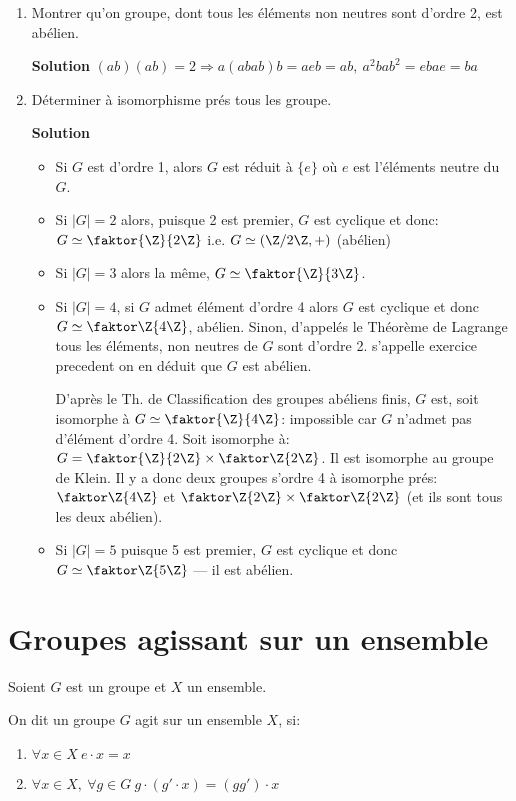 \begin{examplebox}
	\begin{enumerate}
		\item Montrer qu'on groupe, dont tous les éléments non neutres sont d'ordre 2, est abélien.
		
		\textbf{Solution} $(ab)(ab)=2 \Rightarrow a(abab)b=aeb=ab,\ a^2bab^2=ebae=ba$
		\item Déterminer à isomorphisme prés tous les groupe.
		
		\textbf{Solution} 
		\begin{itemize}
			\item Si $G$ est d'ordre 1, alors $G$ est réduit à $\{e\}$ où $e$ est l'éléments neutre du $G$.
			\item Si $|G|=2$ alors, puisque 2 est premier, $G$ est cyclique et donc: $G\simeq \faktor{\Z}{2\Z}$ i.e. $G\simeq (\Z/2\Z, +)$ (abélien)
			\item Si $|G|=3$ alors la même, $G\simeq \faktor{\Z}{3\Z}$.
			\item Si $|G|=4$, si $G$ admet élément d'ordre 4 alors $G$ est cyclique et donc $G\simeq \faktor\Z{4\Z}$, abélien. Sinon, d'appelés le Théorème de Lagrange tous les éléments, non neutres de $G$ sont d'ordre 2. s'appelle exercice precedent on en déduit que $G$ est abélien.
			
			D'après le Th. de Classification des groupes abéliens finis, $G$ est, soit isomorphe à $G\simeq \faktor{\Z}{4\Z}$: impossible car $G$ n'admet pas d'élément d'ordre 4. Soit isomorphe à: $G=\faktor{\Z}{2\Z}\times \faktor\Z{2\Z}$. Il est isomorphe au groupe de Klein. Il y a donc deux groupes s'ordre 4 à isomorphe prés: $\faktor\Z{4\Z}$ et $\faktor\Z{2\Z}\times\faktor\Z{2\Z}$ (et ils sont tous les deux abélien).
			\item Si $|G|=5$ puisque 5 est premier, $G$ est cyclique et donc $G \simeq \faktor\Z{5\Z}$ --- il est abélien.
		\end{itemize}
	\end{enumerate}
\end{examplebox}

\section{Groupes agissant sur un ensemble} %

Soient $G$ est un groupe et $X$ un ensemble.
\begin{definition}
	On dit un groupe $G$ agit sur un ensemble $X$, si:
	\begin{enumerate}
		\item $\forall x\in X\ e\cdot x= x$
		\item $\forall x\in X,\ \forall g\in G\ g\cdot(g'\cdot x)=(gg')\cdot x$
	\end{enumerate}
\end{definition}

